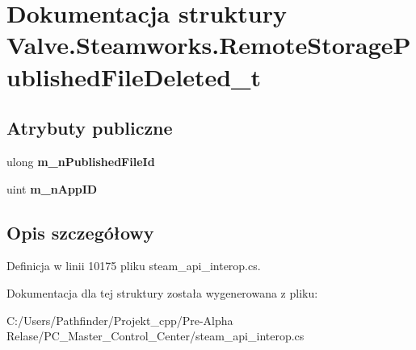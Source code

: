 \hypertarget{struct_valve_1_1_steamworks_1_1_remote_storage_published_file_deleted__t}{}\section{Dokumentacja struktury Valve.\+Steamworks.\+Remote\+Storage\+Published\+File\+Deleted\+\_\+t}
\label{struct_valve_1_1_steamworks_1_1_remote_storage_published_file_deleted__t}
\subsection*{Atrybuty publiczne}
\begin{DoxyCompactItemize}
\item 
\mbox{\label{struct_valve_1_1_steamworks_1_1_remote_storage_published_file_deleted__t_ae0e955a5fd8961666fecdb9a1e9a31f9}} 
ulong {\bfseries m\+\_\+n\+Published\+File\+Id}
\item 
\mbox{\label{struct_valve_1_1_steamworks_1_1_remote_storage_published_file_deleted__t_a4fe91fcc2daa7d7a10fc5a3e9e4fcfb2}} 
uint {\bfseries m\+\_\+n\+App\+ID}
\end{DoxyCompactItemize}


\subsection{Opis szczegółowy}


Definicja w linii 10175 pliku steam\+\_\+api\+\_\+interop.\+cs.



Dokumentacja dla tej struktury została wygenerowana z pliku\+:\begin{DoxyCompactItemize}
\item 
C\+:/\+Users/\+Pathfinder/\+Projekt\+\_\+cpp/\+Pre-\/\+Alpha Relase/\+P\+C\+\_\+\+Master\+\_\+\+Control\+\_\+\+Center/steam\+\_\+api\+\_\+interop.\+cs\end{DoxyCompactItemize}
